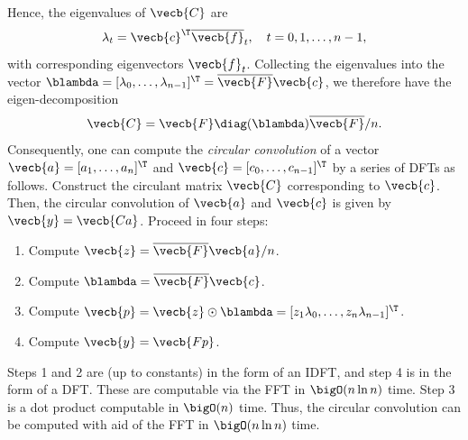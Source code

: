 Hence, the eigenvalues of $\vecb{C}$ are
\begin{equation*}
	\lambda_t = \vecb{c}^\T \overline{\vecb{f}}_t, \quad t = 0, 1, \dots, n-1,
\end{equation*}
with corresponding eigenvectors $\vecb{f}_t$. Collecting the eigenvalues into the vector $\blambda = [\lambda_0, \dots, \lambda_{n-1}]^\T = \overline{\vecb{F}} \vecb{c}$, we therefore have the eigen-decomposition
\begin{equation*}
	\vecb{C} = \vecb{F} \diag(\blambda) \overline{\vecb{F}} / n.
\end{equation*}
Consequently, one can compute the \textit{circular convolution} of a vector $\vecb{a} = [a_1, \dots, a_n]^\T$ and $\vecb{c} = [c_0, \dots, c_{n-1}]^\T$ by a series of DFTs as follows. Construct the circulant matrix $\vecb{C}$ corresponding to $\vecb{c}$. Then, the circular convolution of $\vecb{a}$ and $\vecb{c}$ is given by $\vecb{y} = \vecb{Ca}$. Proceed in four steps:
\begin{enumerate}
	\item Compute $\vecb{z} = \overline{\vecb{F}} \vecb{a} / n$.
	\item Compute $\blambda = \overline{\vecb{F}} \vecb{c}$.
	\item Compute $\vecb{p} = \vecb{z} \odot \blambda = [z_1 \lambda_0, \dots, z_n \lambda_{n-1}]^\T$.
	\item Compute $\vecb{y} = \vecb{Fp}$.
\end{enumerate}
Steps 1 and 2 are (up to constants) in the form of an IDFT, and step 4 is in the form of a DFT. These are computable via the FFT in $\bigO(n \ln n)$ time. Step 3 is a dot product computable in $\bigO(n)$ time. Thus, the circular convolution can be computed with aid of the FFT in $\bigO(n \ln n)$ time.

